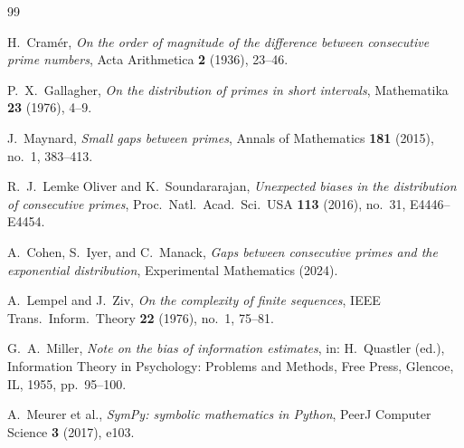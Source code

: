 \documentclass[11pt, a4paper]{amsart}
\theoremstyle{plain}
\theoremstyle{definition}
\begin{document}
\begin{thebibliography}{99}

H.~Cram\'er, \emph{On the order of magnitude of the difference between consecutive prime numbers}, Acta Arithmetica \textbf{2} (1936), 23--46.

P.~X.~Gallagher, \emph{On the distribution of primes in short intervals}, Mathematika \textbf{23} (1976), 4--9.

J.~Maynard, \emph{Small gaps between primes}, Annals of Mathematics \textbf{181} (2015), no.~1, 383--413.

R.~J.~Lemke Oliver and K.~Soundararajan, \emph{Unexpected biases in the distribution of consecutive primes}, Proc.\ Natl.\ Acad.\ Sci.\ USA \textbf{113} (2016), no.~31, E4446--E4454.

A.~Cohen, S.~Iyer, and C.~Manack, \emph{Gaps between consecutive primes and the exponential distribution}, Experimental Mathematics (2024).

A.~Lempel and J.~Ziv, \emph{On the complexity of finite sequences}, IEEE Trans.\ Inform.\ Theory \textbf{22} (1976), no.~1, 75--81.

G.~A.~Miller, \emph{Note on the bias of information estimates}, in: H.~Quastler (ed.), Information Theory in Psychology: Problems and Methods, Free Press, Glencoe, IL, 1955, pp.~95--100.

A.~Meurer et al., \emph{SymPy: symbolic mathematics in Python}, PeerJ Computer Science \textbf{3} (2017), e103.

\end{thebibliography}
\end{document}
